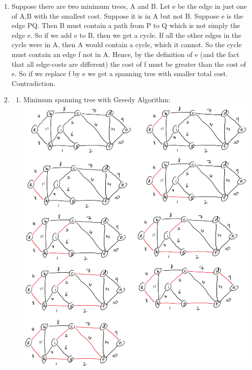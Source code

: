 \documentclass[11pt,fleqn]{article}
\begin{document}
\begin{enumerate}
	\item Suppose there are two minimum trees, A and B. Let e be the edge in just one of A,B with the smallest cost. 
Suppose it is in A but not B. Suppose e is the edge PQ. Then B must contain a path from P to Q which is not simply the edge e. 
So if we add e to B, then we get a cycle. If all the other edges in the cycle were in A, then A would contain a cycle, which it cannot. 
So the cycle must contain an edge f not in A. Hence, by the definition of e (and the fact that all edge-costs are different) the cost of f must be greater than the cost of e. 
So if we replace f by e we get a spanning tree with smaller total cost. Contradiction.
	\item 
	\begin{enumerate}
		\item Minimum spanning tree with Greedy Algorithm: \\
\includegraphics[scale=0.75]{Q9a}

\newpage


\end{enumerate}
\end{enumerate}
\end{document}
